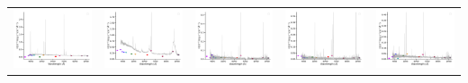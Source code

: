 \begin{center}
\begin{longtable}{l l l l l }
    \includegraphics[width=0.2\linewidth, clip]{Figs/Figs-sdss/spec-0406-51817-0160-STRIPE82-0052-004127.pdf} & \includegraphics[width=0.2\linewidth, clip]{Figs/Figs-sdss/spec-0518-52282-0022-SPLUS-n02n26-033149.pdf} & \includegraphics[width=0.2\linewidth, clip]{Figs/Figs-sdss/spec-0686-52519-0104-STRIPE82-0005-024320.pdf} & \includegraphics[width=0.2\linewidth, clip]{Figs/Figs-sdss/spec-0705-52200-0577-STRIPE82-0056-038958.pdf} & \includegraphics[width=0.2\linewidth, clip]{Figs/Figs-sdss/spec-1023-52818-0521-STRIPE82-0106-057954.pdf} \\

\end{longtable}
\end{center}

